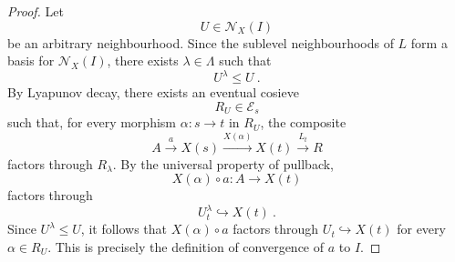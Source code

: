\documentclass[a4paper,reqno,oneside]{amsart}
\theoremstyle{definition}
\theoremstyle{remark}
\numberwithin{equation}{section}
\begin{document}
\begin{proof}
Let
\begin{equation}
    U\in\mathcal N_X(I)
\end{equation}
be an arbitrary neighbourhood. Since the sublevel neighbourhoods of $L$ form
a basis for $\mathcal N_X(I)$, there exists $\lambda\in\Lambda$ such that
\begin{equation}
    U^\lambda\leq U \ .
\end{equation}
By Lyapunov decay, there exists an eventual cosieve
\begin{equation}
    R_U\in\mathcal E_s
\end{equation}
such that, for every morphism $\alpha\colon s\to t$ in $R_U$, the composite
\begin{equation}
    A\xrightarrow{a}X(s)\xrightarrow{X(\alpha)}X(t)
    \xrightarrow{L_t}R
\end{equation}
factors through $R_\lambda$. By the universal property of pullback,
\begin{equation}
    X(\alpha)\circ a\colon A\to X(t)
\end{equation}
factors through
\begin{equation}
    U^\lambda_t\hookrightarrow X(t) \ .
\end{equation}
Since $U^\lambda\leq U$, it follows that $X(\alpha)\circ a$ factors through
$U_t\hookrightarrow X(t)$ for every $\alpha\in R_U$. This is precisely the
definition of convergence of $a$ to $I$.
\end{proof}
\end{document}
